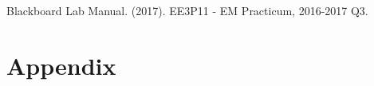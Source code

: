 \begin{thebibliography}{99}

 Blackboard Lab Manual. (2017). EE3P11 - EM Practicum, 2016-2017 Q3.


\end{thebibliography}

\section*{Appendix} 

